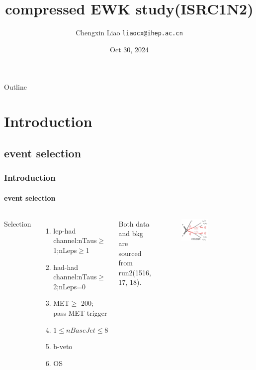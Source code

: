 \documentclass[usenames,dvipsnames]{beamer}
\title[SUSY EWK-2tau Informal meeting]{compressed EWK study(ISRC1N2)}
\date[Oct 30, 2024]{Oct 30, 2024}
\author[Chengxin Liao]{
  Chengxin Liao
  \pdfnewline
  \texttt{liaocx@ihep.ac.cn}
}
\institute{Department of Physics, Shandong University}
\begin{document}
\begin{frame}
\titlepage
\end{frame}

\begin{frame}{Outline}
\tableofcontents
\end{frame}

\section{Introduction}
\subsection{event selection}
\begin{frame}
\frametitle{Introduction}
\framesubtitle{event selection}
\begin{columns}
    \raggedright
    Selection
	\begin{enumerate}[\textbullet]
    \item lep-had channel:nTaus$\geq$1;nLeps$\geq$1
    
    \item had-had channel:nTaus$\geq$2;nLeps=0
    
    \item MET$\geq$ 200; pass MET trigger
    
    \item $1\leq nBaseJet\leq 8$
     
    \item b-veto
    
    \item OS
    \end{enumerate}
    \vskip 0.2cm
    
%    
    Both data and bkg are sourced from run2(1516, 17, 18).
%    
    
    \raggedleft
    \begin{figure}
    \includegraphics[width = 0.5\textwidth]{graphics/Feynman diagram.png}
    \end{figure}
 \end{columns}

\end{frame}
\end{document}
